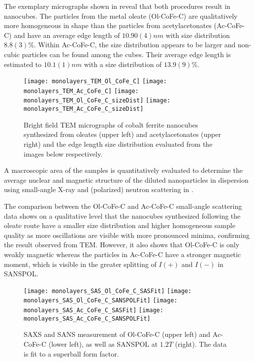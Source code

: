 \documentclass[\main/dresen_thesis.tex]{subfiles}
\begin{document}
  \label{sec:monolayers:nanoparticle:structuralCharacterization}

    The exemplary micrographs shown in  reveal that both procedures result in nanocubes.
    The particles from the metal oleate (Ol-CoFe-C) are qualitatively more homogeneous in shape than the particles from acetylacetonates (Ac-CoFe-C) and have an average edge length of $10.90(4) \unit{nm}$ with size distribution $8.8(3) \unit{\%}$.
    Within Ac-CoFe-C, the size distribution appears to be larger and non-cubic particles can be found among the cubes.
    Their average edge length is estimated to $10.1(1) \unit{nm}$ with a size distribution of $13.9(9) \unit{\%}$.

    \begin{figure}[tb]
      \centering
      \hspace{0.3 cm}
      \texttt{[image: monolayers\_TEM\_Ol\_CoFe\_C]}
      \hspace{0.3 cm}
      \texttt{[image: monolayers\_TEM\_Ac\_CoFe\_C]}
      \texttt{[image: monolayers\_TEM\_Ol\_CoFe\_C\_sizeDist]}
      \texttt{[image: monolayers\_TEM\_Ac\_CoFe\_C\_sizeDist]}
      \caption{\label{fig:monolayers:nanoparticle:tem}Bright field TEM micrographs of cobalt ferrite nanocubes synthesized from oleates (upper left) and acetylacetonates (upper right) and the edge length size distribution evaluated from the images below respectively.}
    \end{figure}

    A macroscopic area of the samples is quantitatively evaluated to determine the average nuclear and magnetic structure of the diluted nanoparticles in dispersion using small-angle X-ray and (polarized) neutron scattering in .

    The comparison between the Ol-CoFe-C and Ac-CoFe-C small-angle scattering data shows on a qualitative level that the nanocubes synthesized following the oleate route have a smaller size distribution and higher homogeneous sample quality as more oscillations are visible with more pronounced minima, confirming the result observed from TEM.
    However, it also shows that Ol-CoFe-C is only weakly magnetic whereas the particles in Ac-CoFe-C have a stronger magnetic moment, which is visible in the greater splitting of $I(+)$ and $I(-)$ in SANSPOL.

    \begin{figure}[tb]
      \centering
      \texttt{[image: monolayers\_SAS\_Ol\_CoFe\_C\_SASFit]}
      \texttt{[image: monolayers\_SAS\_Ol\_CoFe\_C\_SANSPOLFit]}
      \texttt{[image: monolayers\_SAS\_Ac\_CoFe\_C\_SASFit]}
      \texttt{[image: monolayers\_SAS\_Ac\_CoFe\_C\_SANSPOLFit]}
      \caption{\label{fig:monolayers:nanoparticle:sas:AcOlCoFeC}SAXS and SANS measurement of Ol-CoFe-C (upper left) and Ac-CoFe-C (lower left), as well as SANSPOL at $1.2 \unit{T}$ (right). The data is fit to a superball form factor.}
    \end{figure}
\end{document}
